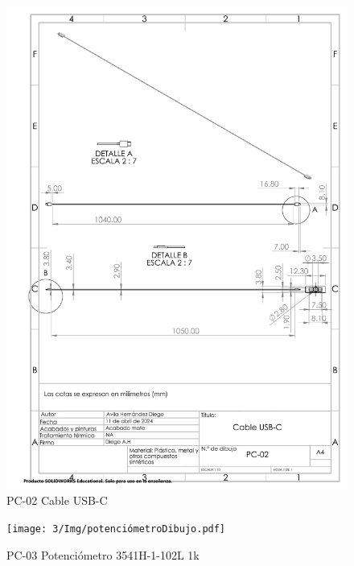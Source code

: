     \begin{figure}[H]
        \centering
        \includegraphics[scale=0.4]{3/Img/cableUSB-CDibujo.pdf}
        \caption{PC-02 Cable USB-C} 
        \label{fig:cableUSB-CDibujo}
    \end{figure}
    \begin{figure}[H]
        \centering
        \texttt{[image: 3/Img/potenciómetroDibujo.pdf]}
        \caption{PC-03 Potenciómetro 3541H-1-102L 1k} 
        \label{fig:potenciómetroDibujo}
    \end{figure}
